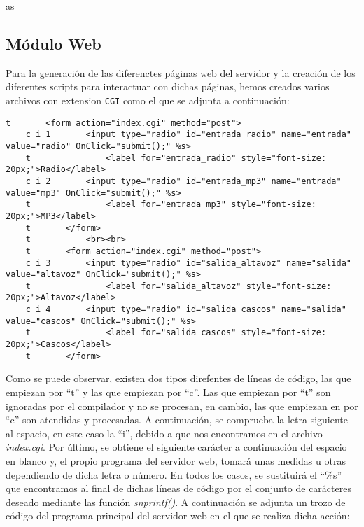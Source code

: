 as\subsection{Módulo Web}
Para la generación de las diferenctes páginas web del servidor y la creación de los diferentes scripts para interactuar con dichas páginas, hemos creados varios archivos con extension \texttt{CGI} como el que se adjunta a continuación:

\begin{lstlisting}[captionpos=b, caption={Ejemplo archivo .CGI}]
    t       <form action="index.cgi" method="post">
    c i 1       <input type="radio" id="entrada_radio" name="entrada" value="radio" OnClick="submit();" %s>
    t               <label for="entrada_radio" style="font-size: 20px;">Radio</label>
    c i 2       <input type="radio" id="entrada_mp3" name="entrada" value="mp3" OnClick="submit();" %s>
    t               <label for="entrada_mp3" style="font-size: 20px;">MP3</label>
    t       </form>
    t           <br><br>
    t       <form action="index.cgi" method="post">
    c i 3       <input type="radio" id="salida_altavoz" name="salida" value="altavoz" OnClick="submit();" %s>
    t               <label for="salida_altavoz" style="font-size: 20px;">Altavoz</label>
    c i 4       <input type="radio" id="salida_cascos" name="salida" value="cascos" OnClick="submit();" %s>
    t               <label for="salida_cascos" style="font-size: 20px;">Cascos</label>
    t       </form>
    \end{lstlisting}

Como se puede observar, existen dos tipos direfentes de líneas de código, las que empiezan por ``t'' y las que empiezan por ``c''. Las que empiezan por ``t'' son ignoradas por el compilador y no se procesan, en cambio, las que empiezan en  por ``c'' son atendidas y procesadas. A continuación, se comprueba la letra siguiente al espacio, en este caso la ``i'', debido a que nos encontramos en el archivo \textit{index.cgi}. Por último, se obtiene el siguiente carácter a continuación del espacio en blanco y, el propio programa del servidor web, tomará unas medidas u otras dependiendo de dicha letra o número. En todos los casos, se sustituirá el ``\%s'' que encontramos al final de dichas líneas de código por el conjunto de carácteres deseado mediante las función \textit{snprintf()}. A continuación se adjunta un trozo de código del programa principal del servidor web en el que se realiza dicha acción:


